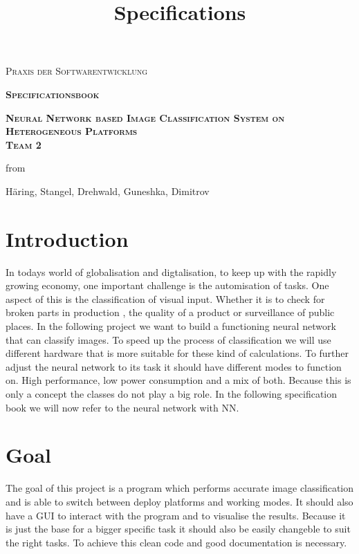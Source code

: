 \documentclass[parskip=full]{scrartcl}
\title{Specifications}
\author{}
\begin{document}
\begin{titlepage}
\centering
	\vspace{3cm}
	{\scshape\LARGE Praxis der Softwarentwicklung\par}
	\vspace{2cm}
	{\scshape\Huge\bfseries Specificationsbook \par}	
	\vspace{2cm}
	{\scshape\Huge\bfseries Neural Network based Image Classification System on Heterogeneous Platforms \\ Team 2 \par}
	\vspace{2cm}
	{\Large from \par}
	\vspace{0.25cm}
	{\Large Häring, Stangel, Drehwald, Guneshka, Dimitrov \par}
	\vfill
\end{titlepage}
\newpage
\tableofcontents
\newpage
\section{Introduction}
In todays world of globalisation and digtalisation, to keep up with the rapidly growing economy, one important challenge is the automisation of tasks. One aspect of this is the classification of visual input. Whether it is to check for broken parts in production , the quality of a product or surveillance of public places. In the following project we want to build a functioning neural network that can classify images. To speed up the process of classification we will use different hardware that is more suitable for these kind of calculations. To further adjust the neural network to its task it should have different modes to function on. High performance, low power consumption and a mix of both. Because this is only a concept the classes do not play a big role. In the following specification book we will now refer to the neural network with NN.

\section{Goal}
The goal of this project is a program which performs accurate image classification and is able to switch between deploy platforms and working modes.
It should also have a GUI to interact with the program and to visualise the results.
Because it is just the base for a bigger specific task it should also be easily changeble to suit the right tasks. To achieve this clean code and good documentation is necessary.
\end{document}
